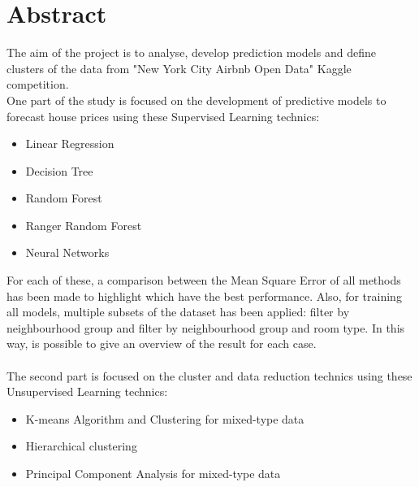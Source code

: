 \documentclass{FR16}
\begin{document}
\maketitle

\newpage
\tableofcontents
\newpage
\listoffigures
\newpage
\section{Abstract}
The aim of the project is to analyse, develop prediction models and define  clusters of the data from "New York City Airbnb Open Data" Kaggle competition.
\\ One part of the study is focused on the development of predictive models to forecast house prices using these Supervised Learning technics:\begin{itemize}
\itemsep0em 
\item Linear Regression
\item Decision Tree
\item Random Forest
\item Ranger Random Forest
\item Neural Networks
\end{itemize}
For each of these, a comparison between the Mean Square Error of all methods has been made to highlight which have the best performance. Also, for training all models, multiple subsets of the dataset has been applied: filter by neighbourhood group and filter by neighbourhood group and room type. In this way, is possible to give an overview of the result for each case.\\\\
The second part is focused on the cluster and data reduction technics using these Unsupervised Learning technics:
\begin{itemize}
\itemsep0em
\item K-means Algorithm and Clustering for mixed-type data
\item Hierarchical clustering
\item Principal Component Analysis for mixed-type data
\end{itemize}

\end{document}
